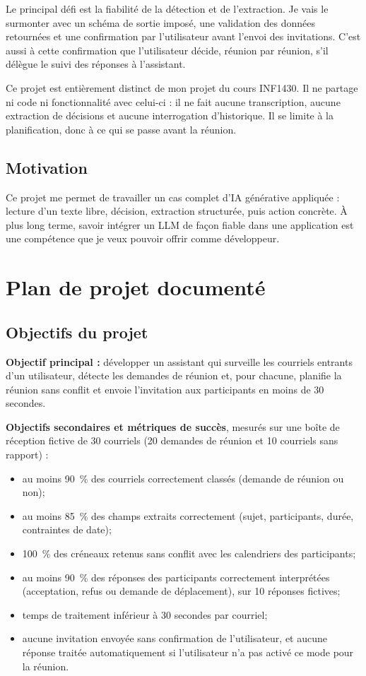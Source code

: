 \documentclass[11pt,letterpaper]{article}
\begin{document}
Le principal défi est la fiabilité de la détection et de l'extraction. Je vais le surmonter avec un schéma de sortie imposé, une validation des données retournées et une confirmation par l'utilisateur avant l'envoi des invitations. C'est aussi à cette confirmation que l'utilisateur décide, réunion par réunion, s'il délègue le suivi des réponses à l'assistant.

Ce projet est entièrement distinct de mon projet du cours INF1430. Il ne partage ni code ni fonctionnalité avec celui-ci : il ne fait aucune transcription, aucune extraction de décisions et aucune interrogation d'historique. Il se limite à la planification, donc à ce qui se passe avant la réunion.

\subsection{Motivation}

Ce projet me permet de travailler un cas complet d'IA générative appliquée : lecture d'un texte libre, décision, extraction structurée, puis action concrète. À plus long terme, savoir intégrer un LLM de façon fiable dans une application est une compétence que je veux pouvoir offrir comme développeur.

\section{Plan de projet documenté}

\subsection{Objectifs du projet}

\textbf{Objectif principal :} développer un assistant qui surveille les courriels entrants d'un utilisateur, détecte les demandes de réunion et, pour chacune, planifie la réunion sans conflit et envoie l'invitation aux participants en moins de 30 secondes.

\textbf{Objectifs secondaires et métriques de succès}, mesurés sur une boîte de réception fictive de 30 courriels (20 demandes de réunion et 10 courriels sans rapport) :
\begin{itemize}
  \item au moins 90~\% des courriels correctement classés (demande de réunion ou non);
  \item au moins 85~\% des champs extraits correctement (sujet, participants, durée, contraintes de date);
  \item 100~\% des créneaux retenus sans conflit avec les calendriers des participants;
  \item au moins 90~\% des réponses des participants correctement interprétées (acceptation, refus ou demande de déplacement), sur 10 réponses fictives;
  \item temps de traitement inférieur à 30 secondes par courriel;
  \item aucune invitation envoyée sans confirmation de l'utilisateur, et aucune réponse traitée automatiquement si l'utilisateur n'a pas activé ce mode pour la réunion.
\end{itemize}
\end{document}
